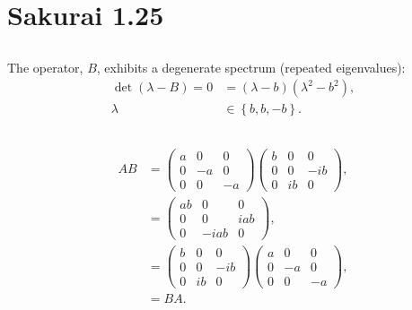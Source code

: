 \documentclass[
a4paper,
10pt,
twoside,
]{article}
\begin{document}
\section{Sakurai 1.25}
\subsection{} %
The operator, $B$, exhibits a degenerate spectrum (repeated eigenvalues):
\begin{align}
	\det(\lambda-B) = 0 &= (\lambda-b)(\lambda^2-b^2),\\
	\lambda &\in \left\{ b,b,-b \right\}.
\end{align}

\subsection{} %
\begin{align}
	AB &= \begin{pmatrix}
		a & 0 & 0 \\
		0 & -a & 0 \\
		0 & 0 & -a 
	\end{pmatrix}\begin{pmatrix}
		b & 0 & 0 \\
		0 & 0 & -ib \\
		0 & ib & 0 
	\end{pmatrix},\\
	&= \begin{pmatrix}
		ab & 0 & 0 \\
		0 & 0 & iab \\
		0 & -iab & 0 
	\end{pmatrix},\\
	&= \begin{pmatrix}
		b & 0 & 0 \\
		0 & 0 & -ib \\
		0 & ib & 0 
	\end{pmatrix}\begin{pmatrix}
		a & 0 & 0 \\
		0 & -a & 0 \\
		0 & 0 & -a 
	\end{pmatrix},\\
	&= BA.
\end{align}
\end{document}

